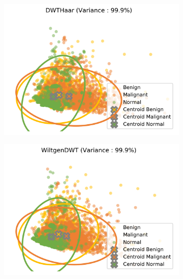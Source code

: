 \begin{figure}[H]
    \begin{subfigure}{.3\textwidth}
      \includegraphics[width=\textwidth]{contents/chapter_4/resources/visualisation_frequency_DWTHaar.png}
    \end{subfigure}
    \begin{subfigure}{.3\textwidth}
      \includegraphics[width=\textwidth]{contents/chapter_4/resources/visualisation_frequency_WiltgenDWT.png}
    \end{subfigure}
    \begin{subfigure}{.3\textwidth}

\end{subfigure}
\end{figure}
